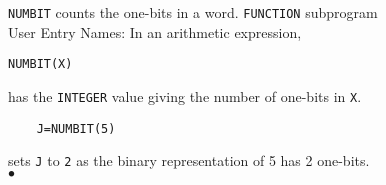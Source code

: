           
          
\Submitter{}                 
         
{\tt NUMBIT} counts the one-bits in a word.
\Structure
{\tt FUNCTION} subprogram \\
User Entry Names: 
\Usage
In an arithmetic expression,
\begin{center}
{\tt NUMBIT(X)}
\end{center}
has the {\tt INTEGER} value giving the number of one-bits in {\tt X}.
\Examples
\begin{verbatim}
    J=NUMBIT(5)
\end{verbatim}
sets {\tt J} to {\tt 2} as the binary representation of 5 has 2 one-bits.
\\ $\bullet$
